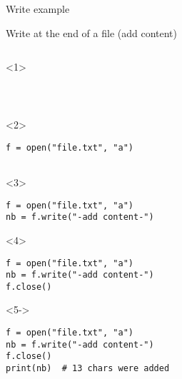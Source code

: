 \begin{frame}[fragile]{Write example}

  Write at the end of a file (add content)

  \begin{columns}[onlytextwidth]
    \begin{column}{\textwidth}

      \begin{onlyenv}<1>
        \begin{lstlisting}[style=python]



 \end{lstlisting}
      \end{onlyenv}

      \begin{onlyenv}<2>
        \begin{lstlisting}[style=python]
f = open("file.txt", "a")


 \end{lstlisting}
      \end{onlyenv}

      \begin{onlyenv}<3>
        \begin{lstlisting}[style=python]
f = open("file.txt", "a")
nb = f.write("-add content-")

 \end{lstlisting}
      \end{onlyenv}

      \begin{onlyenv}<4>
        \begin{lstlisting}[style=python]
f = open("file.txt", "a")
nb = f.write("-add content-")
f.close()
 \end{lstlisting}
      \end{onlyenv}

      \begin{onlyenv}<5->
        \begin{lstlisting}[style=python]
f = open("file.txt", "a")
nb = f.write("-add content-")
f.close()
print(nb)  # 13 chars were added \end{lstlisting}
      \end{onlyenv}

    \end{column}
  \end{columns}

\end{frame}


